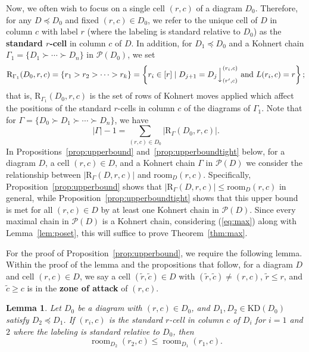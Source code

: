 \documentclass[letterpaper,10pt]{article}
\newcommand{\ldownarrow}{\Big\downarrow}
\newtheorem{lemma}[theorem]{Lemma}
\DeclareMathOperator{\room}{room}
\begin{document}
Now, we often wish to focus on a single cell $(r, c)$ of a diagram $D_0$. Therefore, for any $D \preceq D_0$ and fixed $(r, c) \in D_0$, we refer to the unique cell of $D$ in column $c$ with label $r$ (where the labeling is standard relative to $D_0$) as the \textbf{standard $r$-cell} in column $c$ of $D$. In addition, for $D_1\preceq D_0$ and a Kohnert chain $\Gamma_1 = \{D_1 \succ \cdots \succ D_n\}$ in $\mathcal{P}(D_0)$, we set
\[\mathrm{R}_{\Gamma_1}(D_0,r, c) = \{r_1 > r_2 > \cdots > r_k\} = \left\{r_i \in [r] \mid D_{j+1} = D_j\ldownarrow^{(r_i,c)}_{(r',c)} \text{ and } L(r_i, c) = r\right\};\] that is, $\mathrm{R}_{\Gamma_1}(D_0,r, c)$
is the set of rows of Kohnert moves applied which affect the positions of the standard $r$-cells in column $c$ of the diagrams of $\Gamma_1$. Note that for $\Gamma = \{D_0\succ D_1 \succ \cdots \succ D_n\}$, we have
\begin{equation}\label{eq:max}
    |\Gamma|-1 = \sum_{(r, c) \in D_0}|\mathrm{R}_{\Gamma}(D_0,r, c)|.
\end{equation}
In Propositions~\ref{prop:upperbound} and~\ref{prop:upperboundtight} below, for a diagram $D$, a cell $(r,c)\in D$, and a Kohnert chain $\Gamma$ in $\mathcal{P}(D)$ we consider the relationship between $|\mathrm{R}_{\Gamma}(D,r,c)|$ and $\mathrm{room}_D(r,c)$. Specifically, Proposition~\ref{prop:upperbound} shows that $|\mathrm{R}_{\Gamma}(D,r,c)|\le\mathrm{room}_D(r,c)$ in general, while Proposition~\ref{prop:upperboundtight} shows that this upper bound is met for all $(r,c)\in D$ by at least one Kohnert chain in $\mathcal{P}(D)$. Since every maximal chain in $\mathcal{P}(D)$ is a Kohnert chain, considering (\ref{eq:max}) along with Lemma~\ref{lem:poset}, this will suffice to prove Theorem~\ref{thm:max}.


For the proof of Proposition~\ref{prop:upperbound}, we require the following lemma. Within the proof of the lemma and the propositions that follow, for a diagram $D$ and cell $(r,c)\in D$, we say a cell $(\tilde{r}, \tilde{c}) \in D$ with $(\tilde{r}, \tilde{c}) \neq (r, c)$, $\tilde{r} \leq r$, and $\tilde{c} \geq c$ is in the \textbf{zone of attack} of $(r, c)$.

\begin{lemma}\label{lem:roomdecreasing}
    Let $D_0$ be a diagram with $(r, c) \in D_0$, and $D_1,D_2\in\mathrm{KD}(D_0)$ satisfy $D_2\preceq D_1$. If $(r_i, c)$ is the standard $r$-cell in column $c$ of $D_i$ for $i=1$ and $2$ where the labeling is standard relative to $D_0$, then
    \[\room_{D_2}(r_2, c) \leq \room_{D_1}(r_1, c).\]
\end{lemma}
\end{document}
